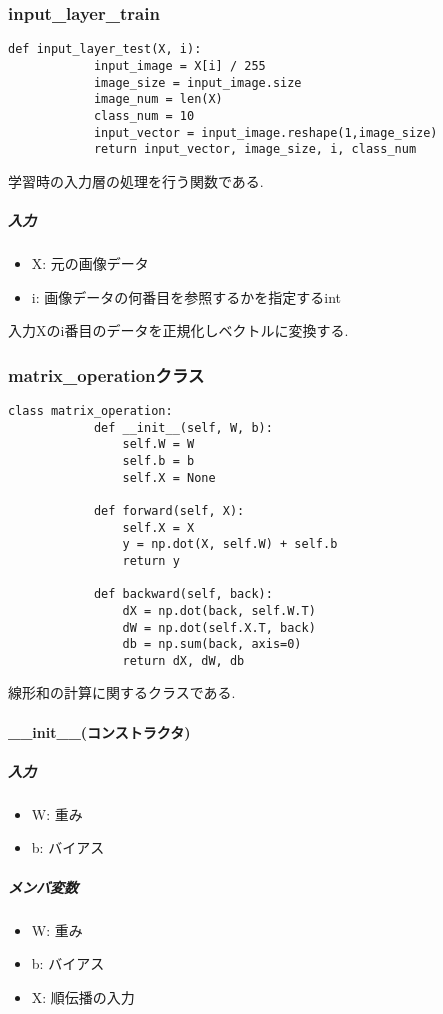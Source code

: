 \documentclass[a4j, titlepage]{jarticle}
\begin{document}
    \subsubsection{input\_layer\_train}
        \begin{lstlisting}[caption=テストの入力層の処理,label=fuga]
        def input_layer_test(X, i):
            input_image = X[i] / 255
            image_size = input_image.size
            image_num = len(X)
            class_num = 10
            input_vector = input_image.reshape(1,image_size)
            return input_vector, image_size, i, class_num
        \end{lstlisting}
        学習時の入力層の処理を行う関数である.
            \subparagraph*{入力}
            \begin{itemize}
                \item X: 元の画像データ
                \item i: 画像データの何番目を参照するかを指定するint
            \end{itemize}
            入力Xのi番目のデータを正規化しベクトルに変換する.

    \subsubsection{matrix\_operationクラス}
        \begin{lstlisting}[caption=線形和の計算 ,label=fuga]
        class matrix_operation:
            def __init__(self, W, b):
                self.W = W
                self.b = b
                self.X = None

            def forward(self, X):
                self.X = X
                y = np.dot(X, self.W) + self.b
                return y

            def backward(self, back):
                dX = np.dot(back, self.W.T)
                dW = np.dot(self.X.T, back)
                db = np.sum(back, axis=0)
                return dX, dW, db
        \end{lstlisting}
        線形和の計算に関するクラスである.
        \paragraph*{\_\_init\_\_(コンストラクタ)}
            \subparagraph*{入力}
            \begin{itemize}
                \item W: 重み
                \item b: バイアス
            \end{itemize}
            \subparagraph*{メンバ変数}
            \begin{itemize}
                \item W: 重み
                \item b: バイアス
                \item X: 順伝播の入力
            \end{itemize}
\end{document}
